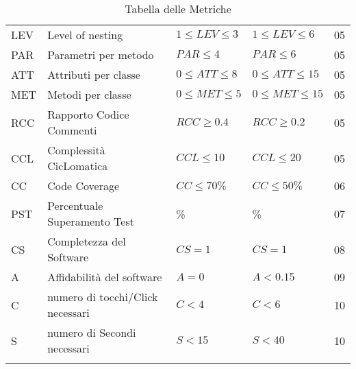 \begin{longtable}{ 
		>{\centering}p{} 
		>{}p{}
        >{\centering}p{}
        >{\centering}p{}
        >{}p{} }
            LEV & Level of nesting & $1\leq LEV \leq 3$ & $1\leq LEV \leq 6$ & 05 \\

            PAR & Parametri per metodo & $PAR \leq 4$ & $PAR \leq 6$ & 05 \\

            ATT & Attributi per classe & $0 \leq ATT \leq 8$ & $0 \leq ATT \leq 15$ & 05 \\

            MET & Metodi per classe & $0 \leq MET \leq 5$ & $0 \leq MET \leq 15$ & 05 \\

            RCC & Rapporto Codice Commenti & $RCC \geq 0.4$ & $RCC \geq 0.2$  & 05 \\

            CCL & Complessità CicLomatica & $CCL \leq 10 $ & $CCL \leq 20 $& 05 \\

            CC & Code Coverage & $CC\leq 70\%$ & $CC\leq 50\%$ & 06 \\

            PST & Percentuale Superamento Test & 100\% & 85\% & 07 \\


            CS & Completezza del Software & $CS=1$ & $CS=1$ & 08 \\

            A & Affidabilità del software & $A=0$ & $A < 0.15$ & 09 \\

           C & numero di tocchi/Click necessari & $C<4$ & $C<6$& 10 \\

           S & numero di Secondi necessari & $S<15$ & $S<40$ & 10 \\

           
           \caption{Tabella delle Metriche}
        \end{longtable}


